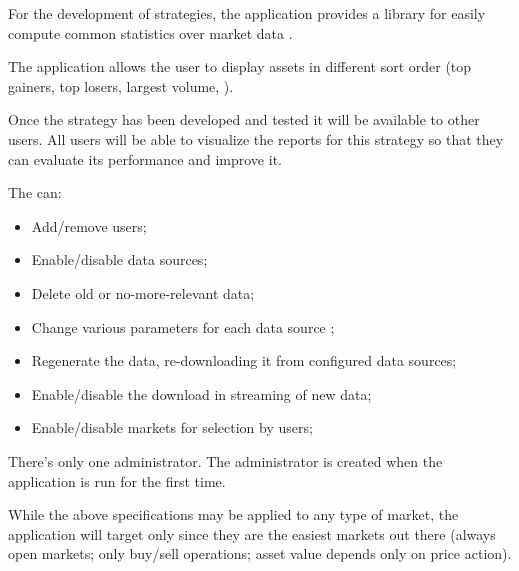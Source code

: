 For the development of strategies, the application provides a library for easily
compute common statistics over market data .

The application allows the user to display assets in different sort order (top
gainers, top losers, largest volume, \etc).

Once the strategy has been developed and tested it will be available to other
users. All users will be able to visualize the reports for this strategy so that
they can evaluate its performance and improve it. 

The  can:
\begin{itemize}
	\item Add/remove users;
	\item Enable/disable data sources;
	\item Delete old or no-more-relevant data;
	\item Change various parameters for each data source ;
	\item Regenerate the data, re-downloading it from configured data
		sources;
	\item Enable/disable the download in streaming of new data;
	\item Enable/disable markets for selection by users;
\end{itemize}

There's only one administrator. The administrator is created when the
application is run for the first time.

While the above specifications may be applied to any type of market, the
application will target only  since they are
the easiest markets out there (always open markets; only buy/sell operations;
asset value depends only on price action).
